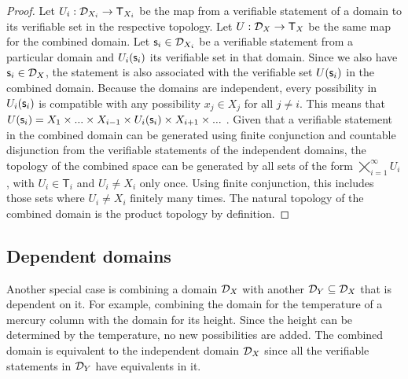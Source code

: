 \begin{mathSection}
	\begin{proof}
		Let $U_i : \mathcal{D}_{X_i} \to \mathsf{T}_{X_i}$ be the map from a verifiable statement of a domain to its verifiable set in the respective topology. Let $U : \mathcal{D}_{X} \to \mathsf{T}_X$ be the same map for the combined domain. Let $\mathsf{s}_i \in \mathcal{D}_{X_i}$ be a verifiable statement from a particular domain and $U_i(\mathsf{s}_i)$ its verifiable set in that domain. Since we also have $\mathsf{s}_i \in \mathcal{D}_{X}$, the statement is also associated with the verifiable set $U(\mathsf{s}_i)$ in the combined domain. Because the domains are independent, every possibility in $U_i(\mathsf{s}_i)$ is compatible with any possibility $x_j \in X_j$ for all $j \neq i$. This means that $U(\mathsf{s}_i)=X_1\times ... \times X_{i-1} \times U_i(\mathsf{s}_i) \times X_{i+1} \times ...$ . Given that a verifiable statement in the combined domain can be generated using finite conjunction and countable disjunction from the verifiable statements of the independent domains, the topology of the combined space can be generated by all sets of the form $\bigtimes\limits_{i=1}^{\infty} U_{i}$, with $U_i \in \mathsf{T}_i$ and $U_i \neq X_i$ only once. Using finite conjunction, this includes those sets where $U_i \neq X_i$ finitely many times. The natural topology of the combined domain is the product topology by definition.
	\end{proof}
\end{mathSection}

\subsection{Dependent domains}

Another special case is combining a domain $\mathcal{D}_X$ with another $\mathcal{D}_Y \subseteq \mathcal{D}_X$ that is dependent on it. For example, combining the domain for the temperature of a mercury column with the domain for its height. Since the height can be determined by the temperature, no new possibilities are added. The combined domain is equivalent to the independent domain $\mathcal{D}_X$ since all the verifiable statements in $\mathcal{D}_Y$ have equivalents in it.

